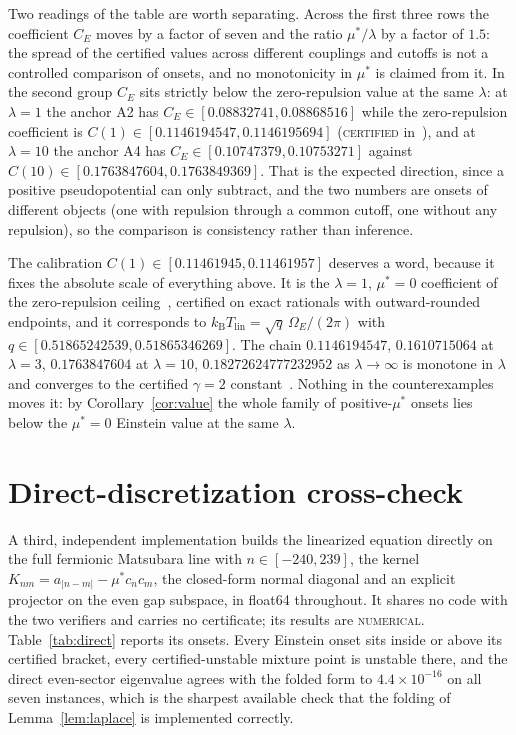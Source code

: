 \documentclass[11pt]{article}
\newcommand{\kb}{k_{\mathrm B}}
\newcommand{\Tlin}{T_{\mathrm{lin}}}
\newcommand{\OmE}{\Omega_E}
\newcommand{\muS}{\mu^{*}}
\theoremstyle{definition}
\theoremstyle{remark}
\begin{document}
Two readings of the table are worth separating. Across the first three rows the coefficient
$C_E$ moves by a factor of seven and the ratio $\muS/\lambda$ by a factor of $1.5$: the
spread of the certified values across different couplings and cutoffs is not a controlled
comparison of onsets, and no monotonicity in $\muS$ is claimed from it. In the second group
$C_E$ sits strictly below the zero-repulsion value at the same $\lambda$: at $\lambda=1$
the anchor A2 has $C_E\in[0.08832741,0.08868516]$ while the zero-repulsion coefficient is
$C(1)\in[0.1146194547,0.1146195694]$ (\textsc{certified} in~\cite{finiteband,univglue}),
and at $\lambda=10$ the anchor A4 has $C_E\in[0.10747379,0.10753271]$ against
$C(10)\in[0.1763847604,0.1763849369]$. That is the expected direction, since a positive
pseudopotential can only subtract, and the two numbers are onsets of different objects (one
with repulsion through a common cutoff, one without any repulsion), so the comparison is
consistency rather than inference.

The calibration $C(1)\in[0.11461945,0.11461957]$ deserves a word, because it fixes the
absolute scale of everything above. It is the $\lambda=1$, $\muS=0$ coefficient of the
zero-repulsion ceiling~\cite{finiteband,univglue}, certified on exact rationals with
outward-rounded endpoints, and it corresponds to $\kb\Tlin=\sqrt{q}\,\OmE/(2\pi)$ with
$q\in[0.51865242539,0.51865346269]$. The chain $0.1146194547$, $0.1610715064$ at
$\lambda=3$, $0.1763847604$ at $\lambda=10$, $0.18272624777232952$ as
$\lambda\to\infty$ is monotone in $\lambda$ and converges to the certified $\gamma=2$
constant~\cite{gamma}. Nothing in the counterexamples moves it: by
Corollary~\ref{cor:value} the whole family of positive-$\muS$ onsets lies below the
$\muS=0$ Einstein value at the same $\lambda$.

\section{Direct-discretization cross-check}\label{sec:num}

A third, independent implementation builds the linearized equation directly on the full
fermionic Matsubara line with $n\in[-240,239]$, the kernel
$K_{nm}=a_{|n-m|}-\muS c_nc_m$, the closed-form normal diagonal and an explicit projector on
the even gap subspace, in float64 throughout. It shares no code with the two verifiers and
carries no certificate; its results are \textsc{numerical}. Table~\ref{tab:direct} reports
its onsets. Every Einstein onset sits inside or above its certified bracket, every
certified-unstable mixture point is unstable there, and the direct even-sector eigenvalue
agrees with the folded form to $4.4\times10^{-16}$ on all seven instances, which is the
sharpest available check that the folding of Lemma~\ref{lem:laplace} is implemented
correctly.
\end{document}
